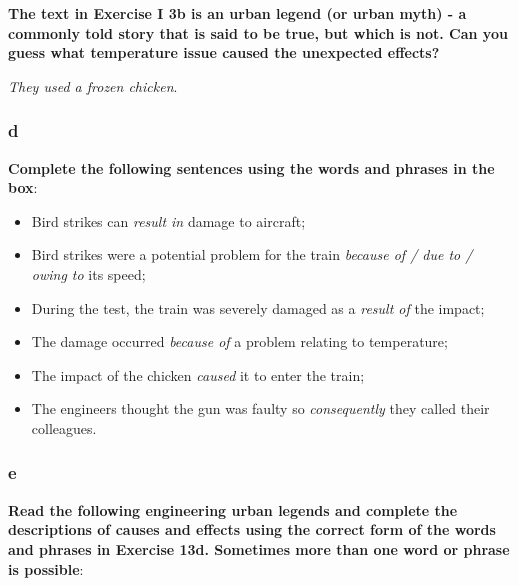 \textbf{The text in Exercise I 3b is an urban legend (or urban myth) - a commonly told story that is said to be true, but which is not. Can you guess what temperature issue caused the unexpected effects?}

\textit{They used a frozen chicken}.

\subsubsection{d}

\textbf{Complete the following sentences using the words and phrases in the box}:

\begin{itemize}

\item Bird strikes can \textit{result in} damage to aircraft;
\item Bird strikes were a potential problem for the train \textit{because of / due to / owing to} its speed;
\item During the test, the train was severely damaged as a \textit{result of} the impact;
\item The damage occurred \textit{because of} a problem relating to temperature;
\item The impact of the chicken \textit{caused} it to enter the train;
\item The engineers thought the gun was faulty so \textit{consequently} they called their colleagues.

\end{itemize}

\subsubsection{e}

\textbf{Read the following engineering urban legends and complete the descriptions of causes and effects using the correct form of the words and phrases in Exercise 13d. Sometimes more than one word or phrase is possible}:

